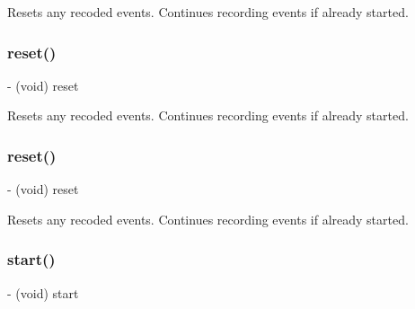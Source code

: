 Resets any recoded events. Continues recording events if already started. \mbox{\label{interface_p_o_p_animation_tracer_af539c16668e279fc6100f346bfe2d710}} 
\subsubsection{\texorpdfstring{reset()}{reset()}\hspace{0.1cm}{\footnotesize\ttfamily [2/3]}}
{\footnotesize\ttfamily -\/ (void) reset \begin{DoxyParamCaption}{ }\end{DoxyParamCaption}}

Resets any recoded events. Continues recording events if already started. \mbox{\label{interface_p_o_p_animation_tracer_af539c16668e279fc6100f346bfe2d710}} 
\subsubsection{\texorpdfstring{reset()}{reset()}\hspace{0.1cm}{\footnotesize\ttfamily [3/3]}}
{\footnotesize\ttfamily -\/ (void) reset \begin{DoxyParamCaption}{ }\end{DoxyParamCaption}}

Resets any recoded events. Continues recording events if already started. \mbox{\label{interface_p_o_p_animation_tracer_a0b6ce421204778a564f094dde9b4a3ac}} 
\subsubsection{\texorpdfstring{start()}{start()}\hspace{0.1cm}{\footnotesize\ttfamily [1/3]}}
{\footnotesize\ttfamily -\/ (void) start \begin{DoxyParamCaption}{ }\end{DoxyParamCaption}}

